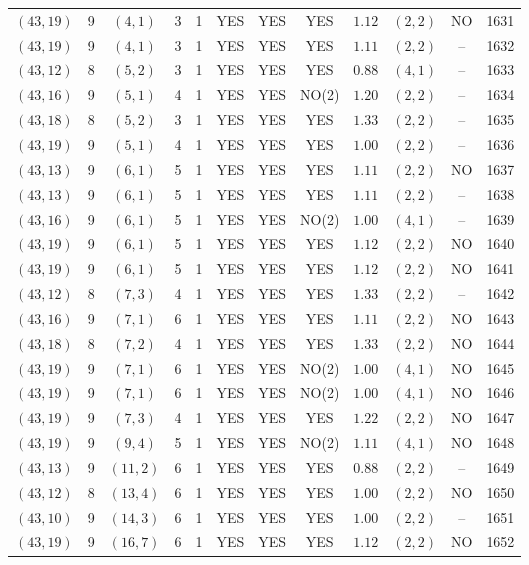 \begin{longtable}{|c|c|c|c|c|c|c|c|c|c|c|c|}
$(43,19)$ & 9 & $(4,1)$ & 3 & 1 & YES & YES & YES & $1.12$ & $(2,2)$ & NO & 1631\\
$(43,19)$ & 9 & $(4,1)$ & 3 & 1 & YES & YES & YES & $1.11$ & $(2,2)$ & -- & 1632\\
$(43,12)$ & 8 & $(5,2)$ & 3 & 1 & YES & YES & YES & $0.88$ & $(4,1)$ & -- & 1633\\
$(43,16)$ & 9 & $(5,1)$ & 4 & 1 & YES & YES & NO(2) & $1.20$ & $(2,2)$ & -- & 1634\\
$(43,18)$ & 8 & $(5,2)$ & 3 & 1 & YES & YES & YES & $1.33$ & $(2,2)$ & -- & 1635\\
$(43,19)$ & 9 & $(5,1)$ & 4 & 1 & YES & YES & YES & $1.00$ & $(2,2)$ & -- & 1636\\
$(43,13)$ & 9 & $(6,1)$ & 5 & 1 & YES & YES & YES & $1.11$ & $(2,2)$ & NO & 1637\\
$(43,13)$ & 9 & $(6,1)$ & 5 & 1 & YES & YES & YES & $1.11$ & $(2,2)$ & -- & 1638\\
$(43,16)$ & 9 & $(6,1)$ & 5 & 1 & YES & YES & NO(2) & $1.00$ & $(4,1)$ & -- & 1639\\
$(43,19)$ & 9 & $(6,1)$ & 5 & 1 & YES & YES & YES & $1.12$ & $(2,2)$ & NO & 1640\\
$(43,19)$ & 9 & $(6,1)$ & 5 & 1 & YES & YES & YES & $1.12$ & $(2,2)$ & NO & 1641\\
$(43,12)$ & 8 & $(7,3)$ & 4 & 1 & YES & YES & YES & $1.33$ & $(2,2)$ & -- & 1642\\
$(43,16)$ & 9 & $(7,1)$ & 6 & 1 & YES & YES & YES & $1.11$ & $(2,2)$ & NO & 1643\\
$(43,18)$ & 8 & $(7,2)$ & 4 & 1 & YES & YES & YES & $1.33$ & $(2,2)$ & NO & 1644\\
$(43,19)$ & 9 & $(7,1)$ & 6 & 1 & YES & YES & NO(2) & $1.00$ & $(4,1)$ & NO & 1645\\
$(43,19)$ & 9 & $(7,1)$ & 6 & 1 & YES & YES & NO(2) & $1.00$ & $(4,1)$ & NO & 1646\\
$(43,19)$ & 9 & $(7,3)$ & 4 & 1 & YES & YES & YES & $1.22$ & $(2,2)$ & NO & 1647\\
$(43,19)$ & 9 & $(9,4)$ & 5 & 1 & YES & YES & NO(2) & $1.11$ & $(4,1)$ & NO & 1648\\
$(43,13)$ & 9 & $(11,2)$ & 6 & 1 & YES & YES & YES & $0.88$ & $(2,2)$ & -- & 1649\\
$(43,12)$ & 8 & $(13,4)$ & 6 & 1 & YES & YES & YES & $1.00$ & $(2,2)$ & NO & 1650\\
$(43,10)$ & 9 & $(14,3)$ & 6 & 1 & YES & YES & YES & $1.00$ & $(2,2)$ & -- & 1651\\
$(43,19)$ & 9 & $(16,7)$ & 6 & 1 & YES & YES & YES & $1.12$ & $(2,2)$ & NO & 1652\\

\end{longtable}
